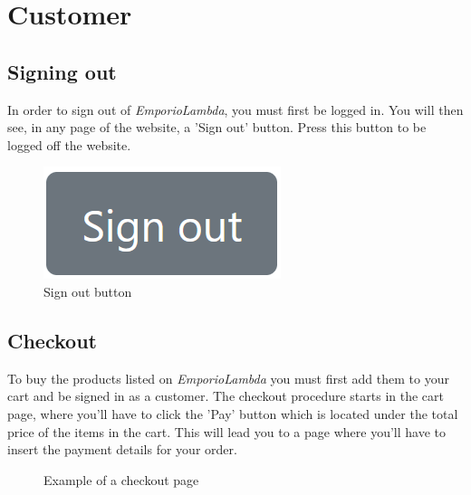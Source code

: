\section{Customer}

\subsection{Signing out}
In order to sign out of \textit{EmporioLambda}, you must first be logged in. You will then see, in any page of the website, a 'Sign out' button. Press this button to be logged off the website.

\begin{figure}[H]
\centering
\includegraphics[scale=0.6]{res/Immagini/SignoutButton}
\caption{Sign out button}
\end{figure}

\subsection{Checkout}
To buy the products listed on \textit{EmporioLambda} you must first add them to your cart and be signed in as a customer. The checkout procedure starts in the cart page, where you'll have to click the 'Pay' button which is located under the total price of the items in the cart. This will lead you to a page where you'll have to insert the payment details for your order.

\begin{figure}[H]
%
\caption{Example of a checkout page}
\end{figure}

